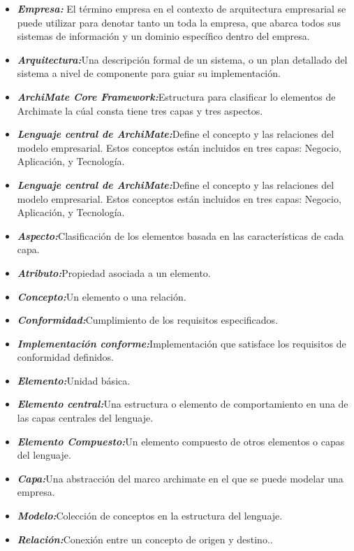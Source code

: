 \begin{itemize}
\item  \textbf{\textit{Empresa:}} El término empresa en el contexto de arquitectura empresarial se puede utilizar para denotar tanto un toda la empresa, que abarca todos sus sistemas de información y un dominio específico dentro del empresa.

\item \textbf{\textit{Arquitectura:}}Una descripción formal de un sistema, o un plan detallado del sistema a nivel de componente para guiar su implementación.

\item \textbf{\textit{ArchiMate Core Framework:}}Estructura para clasificar lo elementos de Archimate la cúal consta tiene tres capas y tres aspectos.

\item \textbf{\textit{Lenguaje central de ArchiMate:}}Define el concepto y las relaciones del modelo empresarial. Estos conceptos están incluidos en tres capas: Negocio, Aplicación, y Tecnología.

\item \textbf{\textit{Lenguaje central de ArchiMate:}}Define el concepto y las relaciones del modelo empresarial. Estos conceptos están incluidos en tres capas: Negocio, Aplicación, y Tecnología.

\item \textbf{\textit{Aspecto:}}Clasificación de los elementos basada en las características de cada capa.

\item \textbf{\textit{Atributo:}}Propiedad asociada  a un elemento.

\item \textbf{\textit{Concepto:}}Un elemento o una relación.

\item \textbf{\textit{Conformidad:}}Cumplimiento de los requisitos especificados.

\item \textbf{\textit{Implementación conforme:}}Implementación que satisface los requisitos de conformidad definidos.

\item \textbf{\textit{Elemento:}}Unidad básica.

\item \textbf{\textit{Elemento central:}}Una estructura o elemento de comportamiento en una de las capas centrales del lenguaje.

\item \textbf{\textit{Elemento Compuesto:}}Un elemento compuesto de otros elementos o capas del lenguaje.

\item \textbf{\textit{Capa:}}Una abstracción del marco archimate en el que se puede modelar una empresa.

\item \textbf{\textit{Modelo:}}Colección de conceptos en la estructura del lenguaje.

\item \textbf{\textit{Relación:}}Conexión entre un concepto de origen y destino..

\end{itemize}


